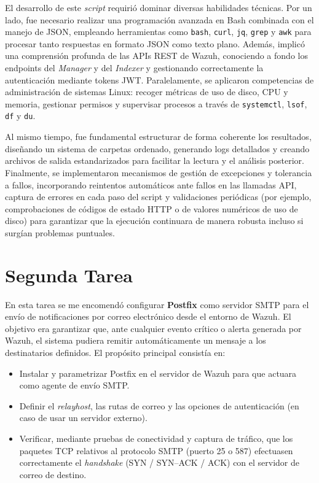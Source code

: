 El desarrollo de este \emph{script} requirió dominar diversas habilidades técnicas. Por un lado, fue necesario realizar una programación avanzada en Bash combinada con el manejo de JSON, empleando herramientas como \texttt{bash}, \texttt{curl}, \texttt{jq}, \texttt{grep} y \texttt{awk} para procesar tanto respuestas en formato JSON como texto plano. Además, implicó una comprensión profunda de las APIs REST de Wazuh, conociendo a fondo los endpoints del \emph{Manager} y del \emph{Indexer} y gestionando correctamente la autenticación mediante tokens JWT. Paralelamente, se aplicaron competencias de administración de sistemas Linux: recoger métricas de uso de disco, CPU y memoria, gestionar permisos y supervisar procesos a través de \texttt{systemctl}, \texttt{lsof}, \texttt{df} y \texttt{du}.

Al mismo tiempo, fue fundamental estructurar de forma coherente los resultados, diseñando un sistema de carpetas ordenado, generando logs detallados y creando archivos de salida estandarizados para facilitar la lectura y el análisis posterior. Finalmente, se implementaron mecanismos de gestión de excepciones y tolerancia a fallos, incorporando reintentos automáticos ante fallos en las llamadas API, captura de errores en cada paso del script y validaciones periódicas (por ejemplo, comprobaciones de códigos de estado HTTP o de valores numéricos de uso de disco) para garantizar que la ejecución continuara de manera robusta incluso si surgían problemas puntuales.  

\section{Segunda Tarea}
En esta tarea se me encomendó configurar \textbf{Postfix} como servidor SMTP para el envío de notificaciones por correo electrónico desde el entorno de Wazuh. El objetivo era garantizar que, ante cualquier evento crítico o alerta generada por Wazuh, el sistema pudiera remitir automáticamente un mensaje a los destinatarios definidos. El propósito principal consistía en:
\begin{itemize}
  \item Instalar y parametrizar Postfix en el servidor de Wazuh para que actuara como agente de envío SMTP.
  \item Definir el \emph{relayhost}, las rutas de correo y las opciones de autenticación (en caso de usar un servidor externo).
  \item Verificar, mediante pruebas de conectividad y captura de tráfico, que los paquetes TCP relativos al protocolo SMTP (puerto 25 o 587) efectuasen correctamente el \emph{handshake} (SYN / SYN–ACK / ACK) con el servidor de correo de destino.
\end{itemize}

